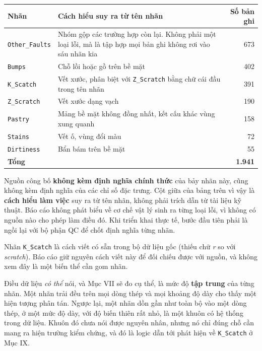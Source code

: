 \documentclass[12pt]{article}
\begin{document}
\begin{center}
\small
\begin{tabular}{@{}p{2.8cm} p{9.4cm} r@{}}
\toprule
\textbf{Nhãn} & \textbf{Cách hiểu suy ra từ tên nhãn} & \textbf{Số bản ghi} \\
\midrule
\texttt{Other\_Faults} & Nhóm gộp các trường hợp còn lại. Không phải một loại lỗi, mà là tập hợp mọi bản ghi không rơi vào sáu nhãn kia & 673 \\
\addlinespace[3pt]
\texttt{Bumps}        & Chỗ lồi hoặc gồ trên bề mặt & 402 \\
\addlinespace[3pt]
\texttt{K\_Scatch}    & Vết xước, phân biệt với \texttt{Z\_Scratch} bằng chữ cái đầu trong tên nhãn & 391 \\
\addlinespace[3pt]
\texttt{Z\_Scratch}   & Vết xước dạng vạch & 190 \\
\addlinespace[3pt]
\texttt{Pastry}       & Mảng bề mặt không đồng nhất, kết cấu khác vùng xung quanh & 158 \\
\addlinespace[3pt]
\texttt{Stains}       & Vết ố, vùng đổi màu & 72 \\
\addlinespace[3pt]
\texttt{Dirtiness}    & Bẩn bám trên bề mặt & 55 \\
\midrule
\textbf{Tổng} & & \textbf{1.941} \\
\bottomrule
\end{tabular}
\end{center}

\begin{notebox}
Nguồn công bố \textbf{không kèm định nghĩa chính thức} của bảy nhãn này, cũng không kèm định nghĩa của các chỉ số đặc trưng. Cột giữa của bảng trên vì vậy là \textbf{cách hiểu làm việc} suy ra từ tên nhãn, không phải trích dẫn từ tài liệu kỹ thuật. Báo cáo không phát biểu về cơ chế vật lý sinh ra từng loại lỗi, vì không có nguồn nào cho phép làm điều đó. Khi triển khai thực tế, bước đầu tiên phải là ngồi lại với bộ phận QC để chốt định nghĩa từng nhãn.

\noindent Nhãn \texttt{K\_Scatch} là cách viết có sẵn trong bộ dữ liệu gốc (thiếu chữ \emph{r} so với \emph{scratch}). Báo cáo giữ nguyên cách viết này để đối chiếu được với nguồn, và không xem đây là một biến thể cần gom nhãn.
\end{notebox}

\noindent Điều dữ liệu \emph{có thể} nói, và Mục VII sẽ đo cụ thể, là mức độ \textbf{tập trung} của từng nhãn. Một nhãn trải đều trên mọi dòng thép và mọi khoảng độ dày cho thấy một hiện tượng phân tán. Ngược lại, một nhãn dồn gần như toàn bộ vào một dòng thép, ở một mức độ dày, với độ biến thiên rất nhỏ, là một khuôn có hệ thống trong dữ liệu. Khuôn đó chưa nói được nguyên nhân, nhưng nó chỉ đúng chỗ cần mang ra hiện trường kiểm chứng, và đó là logic dẫn tới phát hiện về \texttt{K\_Scatch} ở Mục IX.
\end{document}
